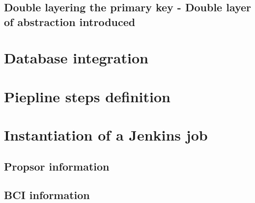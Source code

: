 \documentclass[../main.tex]{subfiles}
\begin{document}
\subsection{Double layering the primary key - Double layer of abstraction introduced}
\section{Database integration}
\section{Piepline steps definition}
\section{Instantiation of a Jenkins job}
\subsection{Propsor information}
\subsection{BCI information}
\cleardoublepage
\end{document}
